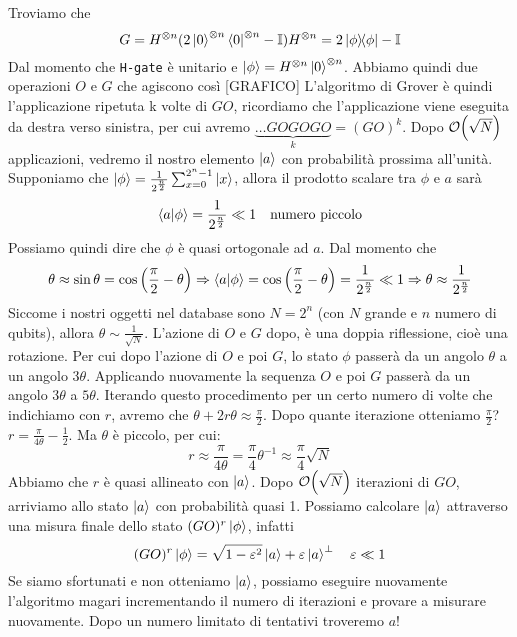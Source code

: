 Troviamo che
\begin{equation*}
    G=H^{\otimes n}(2\ket{0}^{\otimes n}\bra{0}^{\otimes n}-\mathbb{I})H^{\otimes n}=2\op{\phi}{\phi}-\mathbb{I}
\end{equation*}
Dal momento che \texttt{H-gate} è unitario e $\ket \phi = H^{\otimes n}\ket{0}^{\otimes n}$.
Abbiamo quindi due operazioni $O$ e $G$ che agiscono così
[GRAFICO]
L'algoritmo di Grover è quindi l'applicazione ripetuta k volte di $GO$, ricordiamo che l'applicazione viene eseguita da destra verso sinistra, per cui avremo $\underbrace{\dots GOGOGO}_{k}=(GO)^k$. Dopo $\order{\sqrt N}$ applicazioni, vedremo il nostro elemento $\ket a$ con probabilità prossima all'unità.
Supponiamo che $\ket \phi = \frac{1}{2^{\frac n2}}\sum_{x=0}^{2^n-1}\ket x$, allora il prodotto scalare tra $\phi$ e $a$ sarà
\begin{equation*}
    \ip{a}{\phi}=\frac{1}{2^{\frac n2}} \ll 1 \quad \text{numero piccolo}
\end{equation*}
Possiamo quindi dire che $\phi$ è quasi ortogonale ad $a$. Dal momento che
\begin{equation*}
    \theta\approx\sin\theta = \cos \left(\frac \pi 2 -\theta \right) \Rightarrow \ip{a}{\phi} = \cos \left(\frac \pi 2 - \theta \right)=\frac{1}{2^{\frac n2}}\ll 1 \Rightarrow \theta \approx \frac{1}{2^{\frac n2}}
\end{equation*}
Siccome i nostri oggetti nel database sono $N=2^n$ (con $N$ grande e $n$ numero di qubits), allora $\theta\sim \frac{1}{\sqrt N}$. 
L'azione di $O$ e $G$ dopo, è una doppia riflessione, cioè una rotazione. Per cui dopo l'azione di $O$ e poi $G$, lo stato $\phi$ passerà da un angolo $\theta$ a un angolo $3\theta$. Applicando nuovamente la sequenza $O$ e poi $G$ passerà da un angolo $3\theta$ a $5\theta$. Iterando questo procedimento per un certo numero di volte che indichiamo con $r$, avremo che $\theta +2r\theta\approx\frac \pi 2$. Dopo quante iterazione otteniamo $\frac \pi 2$? $r=\frac{\pi}{4\theta}-\frac 12$. Ma $\theta$ è piccolo, per cui:
\begin{equation*}
    r\approx \frac{\pi}{4\theta}=\frac \pi 4 \theta^{-1}\approx \frac \pi 4 \sqrt N
\end{equation*}
Abbiamo che $r$ è quasi allineato con $\ket a$. Dopo $\order{\sqrt N}$ iterazioni di $GO$, arriviamo allo stato $\ket a$ con probabilità quasi 1. Possiamo calcolare $\ket a$ attraverso una misura finale dello stato $(GO)^r\ket \phi$, infatti 
\begin{equation*}
    (GO)^r\ket \phi = \sqrt{1-\varepsilon^2}\ket a + \varepsilon \ket{a}^\perp \quad \varepsilon \ll 1
\end{equation*}
Se siamo sfortunati e non otteniamo $\ket a$, possiamo eseguire nuovamente l'algoritmo magari incrementando il numero di iterazioni e provare a misurare nuovamente. Dopo un numero limitato di tentativi troveremo $a$!
